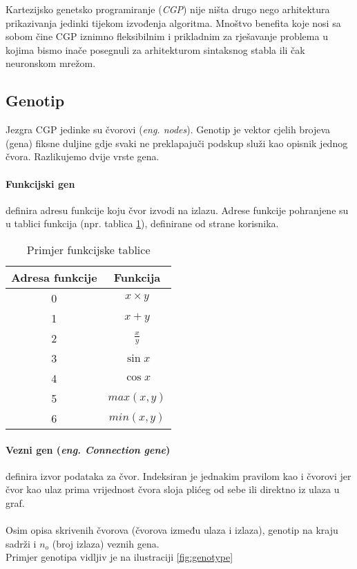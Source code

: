 Kartezijsko genetsko programiranje (\emph{CGP}) nije ništa drugo nego arhitektura prikazivanja jedinki tijekom izvođenja algoritma. 
Mnoštvo benefita koje nosi sa sobom čine CGP iznimno fleksibilnim i prikladnim za rješavanje problema u kojima bismo inače posegnuli za arhitekturom sintaksnog stabla ili čak neuronskom mrežom.

\subsection{Genotip}
Jezgra CGP jedinke su čvorovi (\emph{eng. nodes}).
Genotip je vektor cjelih brojeva (gena) fiksne duljine gdje svaki ne preklapajuči podskup služi kao opisnik jednog čvora.
Razlikujemo dvije vrste gena.

\paragraph{Funkcijski gen}
definira adresu funkcije koju čvor izvodi na izlazu.
Adrese funkcije pohranjene su u tablici funkcija (npr. tablica \ref{table:function_table}), definirane od strane korisnika.

\begin{table}
	\centering
	\begin{tabular}{||c c||}
		\hline
		Adresa funkcije & Funkcija \\ [0.5ex]
		\hline\hline
		0 & $x \times y$ \\
		1 & $x + y$ \\
		2 & $\frac{x}{y}$ \\
		3 & $\sin{x}$ \\
		4 & $\cos{x}$ \\ 
		5 & $max(x, y)$ \\
		6 & $min(x, y)$ \\ [1ex]
		\hline
	\end{tabular}
	\caption{Primjer funkcijske tablice}
	\label{table:function_table}
\end{table}

\paragraph{Vezni gen (\emph{eng. Connection gene})}
definira izvor podataka za čvor.
Indeksiran je jednakim pravilom kao i čvorovi jer čvor kao ulaz prima vrijednost čvora sloja plićeg od sebe ili direktno iz ulaza u graf. \\
\\
Osim opisa skrivenih čvorova (čvorova između ulaza i izlaza), genotip na kraju sadrži i $n_o$ (broj izlaza) veznih gena. \\
Primjer genotipa vidljiv je na ilustraciji \ref{fig:genotype}

